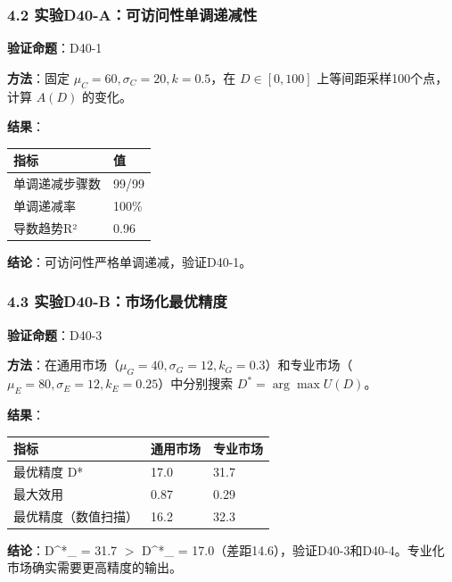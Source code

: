 \documentclass[UTF8, fontset=fandol]{ctexart}
\newcounter{none} %
\begin{document}
\subsubsection{4.2
实验D40-A：可访问性单调递减性}\label{ux5b9eux9a8cd40-aux53efux8bbfux95eeux6027ux5355ux8c03ux9012ux51cfux6027}

\textbf{验证命题}：D40-1

\textbf{方法}：固定 \(\mu_C=60, \sigma_C=20, k=0.5\)，在
\(D \in [0, 100]\) 上等间距采样100个点，计算 \(A(D)\) 的变化。

\textbf{结果}：

{\def\LTcaptype{none} %
\begin{longtable}[]{@{}ll@{}}
\toprule\noalign{}
指标 & 值 \\
\midrule\noalign{}
\endhead
\bottomrule\noalign{}
\endlastfoot
单调递减步骤数 & 99/99 \\
单调递减率 & 100\% \\
导数趋势R² & 0.96 \\
\end{longtable}
}

\textbf{结论}：可访问性严格单调递减，验证D40-1。

\subsubsection{4.3
实验D40-B：市场化最优精度}\label{ux5b9eux9a8cd40-bux5e02ux573aux5316ux6700ux4f18ux7cbeux5ea6}

\textbf{验证命题}：D40-3

\textbf{方法}：在通用市场（\(\mu_G=40, \sigma_G=12, k_G=0.3\)）和专业市场（\(\mu_E=80, \sigma_E=12, k_E=0.25\)）中分别搜索
\(D^* = \arg\max U(D)\)。

\textbf{结果}：

{\def\LTcaptype{none} %
\begin{longtable}[]{@{}lll@{}}
\toprule\noalign{}
指标 & 通用市场 & 专业市场 \\
\midrule\noalign{}
\endhead
\bottomrule\noalign{}
\endlastfoot
最优精度 D* & 17.0 & 31.7 \\
最大效用 & 0.87 & 0.29 \\
最优精度（数值扫描） & 16.2 & 32.3 \\
\end{longtable}
}

\textbf{结论}：D^*_{} = 31.7 $>$ D^*_{} =
17.0（差距14.6），验证D40-3和D40-4。专业化市场确实需要更高精度的输出。
\end{document}
